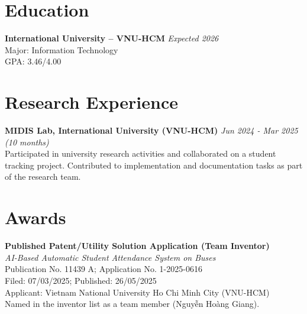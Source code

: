 \section{Education}
\textbf{International University -- VNU-HCM} \hfill \textit{Expected 2026}\\
Major: Information Technology\\
GPA: 3.46/4.00

\section{Research Experience}
\textbf{MIDIS Lab, International University (VNU-HCM)} \hfill \textit{Jun 2024 - Mar 2025 (10 months)}\\
Participated in university research activities and collaborated on a student tracking project.
Contributed to implementation and documentation tasks as part of the research team.

\section{Awards}
\textbf{Published Patent/Utility Solution Application (Team Inventor)} \\
\textit{AI-Based Automatic Student Attendance System on Buses}\\
Publication No. 11439 A; Application No. 1-2025-0616\\
Filed: 07/03/2025; Published: 26/05/2025\\
Applicant: Vietnam National University Ho Chi Minh City (VNU-HCM)\\
Named in the inventor list as a team member (Nguyễn Hoàng Giang).
